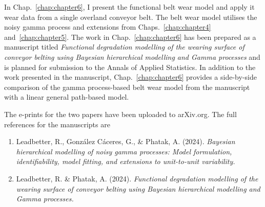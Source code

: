 \documentclass[apa,colorlinks,emptypage]{curtinThesis}
\begin{document}
In Chap.~\ref{chap:chapter6}, I present the functional belt wear model and apply it wear data from a single overland conveyor belt. The belt wear model utilises the noisy gamma process and extensions from Chaps.~\ref{chap:chapter4} and~\ref{chap:chapter5}. The work in Chap.~\ref{chap:chapter6} has been prepared as a manuscript titled 
\textit{Functional degradation modelling of the wearing surface of conveyor belting using Bayesian hierarchical modelling and Gamma processes} and is planned for submission to the Annals of Applied Statistics. In addition to the work presented in the manuscript, Chap.~\ref{chap:chapter6} provides a side-by-side comparison of the gamma process-based belt wear model from the manuscript with a linear general path-based model.

The e-prints for the two papers have been uploaded to arXiv.org. The full references for the manuscripts are
\begin{enumerate}
  \item Leadbetter, R., Gonz\'{a}lez C\'{a}ceres, G., \& Phatak, A. (2024). \textit{Bayesian hierarchical modelling of noisy gamma processes: Model formulation, identifiability, model fitting, and extensions to unit-to-unit variability.}
  \item Leadbetter, R. \& Phatak, A. (2024). \textit{Functional degradation modelling of the wearing surface of conveyor belting using Bayesian hierarchical modelling and Gamma processes.}
\end{enumerate}







\begin{customappendix}{} %



\end{customappendix}

\backmatter{}

\ackstatement %
\end{document}

